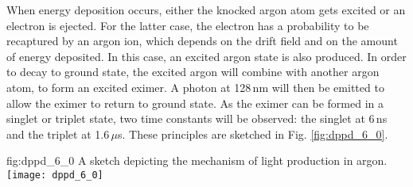 When energy deposition occurs, either the knocked argon atom gets excited or an electron is ejected. For the latter case, the electron has a probability to be recaptured by an argon ion, which depends on the drift field and on the amount of energy deposited. In this case, an excited argon state is also produced. In order to decay to ground state, the excited argon will combine with another argon atom, to form an excited eximer. A photon at 128\,nm will then be emitted to allow the eximer to return to ground state. As the eximer can be formed in a singlet or triplet state, two time constants will be observed: the singlet at 6\,ns and the triplet at 1.6\,$\mu$s. These principles are sketched in Fig. \ref{fig:dppd_6_0}.

\begin{dunefigure}{fig:dppd_6_0}
{A sketch depicting the mechanism of light production in argon.}
\texttt{[image: dppd\_6\_0]}
\end{dunefigure}

